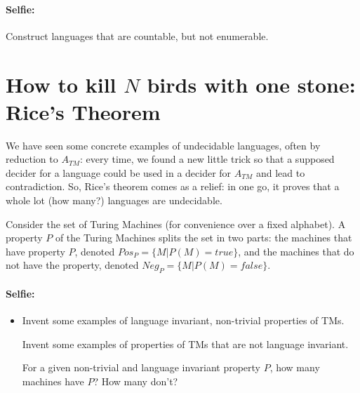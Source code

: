 \paragraph{Selfie:} Construct languages that are countable, but not enumerable.

\section{How to kill $N$ birds with one stone: Rice's Theorem}

We have seen some concrete examples of undecidable languages, often by
reduction to $A_{TM}$: every time, we found a new little trick so that
a supposed decider for a language could be used in a decider for
$A_{TM}$ and lead to contradiction. So, Rice's theorem comes as a
relief: in one go, it proves that a whole lot (how many?) languages
are undecidable.

Consider the set of Turing Machines (for convenience over a fixed
alphabet). A property $P$ of the Turing Machines splits the set in two
parts: the machines that have property $P$, denoted
%
$Pos_P = \{M|P(M) = true\}$, and the machines that do not have the
property, denoted
%
$Neg_P = \{M|P(M) = false\}$.




\paragraph{Selfie:}
\begin{itemize}
\item[]
Invent some examples of language invariant, non-trivial
properties of TMs.

Invent some examples of properties of TMs that are not language
invariant.

For a given non-trivial and language invariant property $P$, how many
machines have $P$? How many don't?
\end{itemize}

